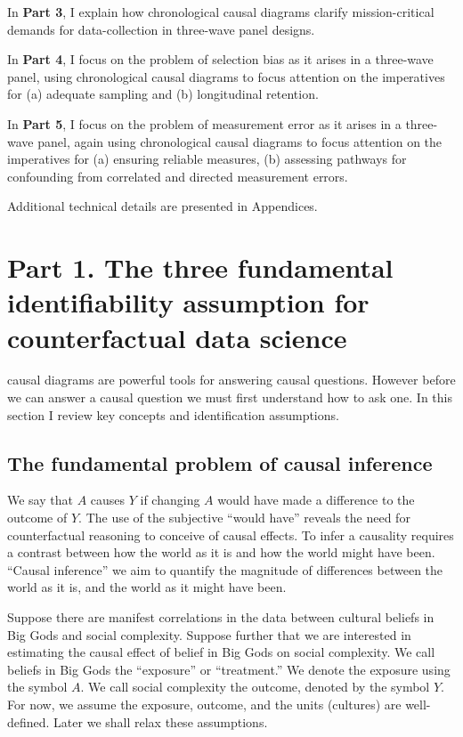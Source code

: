 \documentclass[
  singlecolumn]{report}
\begin{document}
In \textbf{Part 3}, I explain how chronological causal diagrams clarify
mission-critical demands for data-collection in three-wave panel
designs.

In \textbf{Part 4}, I focus on the problem of selection bias as it
arises in a three-wave panel, using chronological causal diagrams to
focus attention on the imperatives for (a) adequate sampling and (b)
longitudinal retention.

In \textbf{Part 5}, I focus on the problem of measurement error as it
arises in a three-wave panel, again using chronological causal diagrams
to focus attention on the imperatives for (a) ensuring reliable
measures, (b) assessing pathways for confounding from correlated and
directed measurement errors.

Additional technical details are presented in Appendices.

\hypertarget{part-1.-the-three-fundamental-identifiability-assumption-for-counterfactual-data-science}{%
\section{Part 1. The three fundamental identifiability assumption for
counterfactual data
science}\label{part-1.-the-three-fundamental-identifiability-assumption-for-counterfactual-data-science}}

causal diagrams are powerful tools for answering causal questions.
However before we can answer a causal question we must first understand
how to ask one. In this section I review key concepts and identification
assumptions.

\hypertarget{the-fundamental-problem-of-causal-inference}{%
\subsection{The fundamental problem of causal
inference}\label{the-fundamental-problem-of-causal-inference}}

We say that \(A\) causes \(Y\) if changing \(A\) would have made a
difference to the outcome of \(Y\). The use of the subjective ``would
have'' reveals the need for counterfactual reasoning to conceive of
causal effects. To infer a causality requires a contrast between how the
world as it is and how the world might have been. ``Causal inference''
we aim to quantify the magnitude of differences between the world as it
is, and the world as it might have been.

Suppose there are manifest correlations in the data between cultural
beliefs in Big Gods and social complexity. Suppose further that we are
interested in estimating the causal effect of belief in Big Gods on
social complexity. We call beliefs in Big Gods the ``exposure'' or
``treatment.'' We denote the exposure using the symbol \(A\). We call
social complexity the outcome, denoted by the symbol \(Y\). For now, we
assume the exposure, outcome, and the units (cultures) are well-defined.
Later we shall relax these assumptions.
\end{document}
